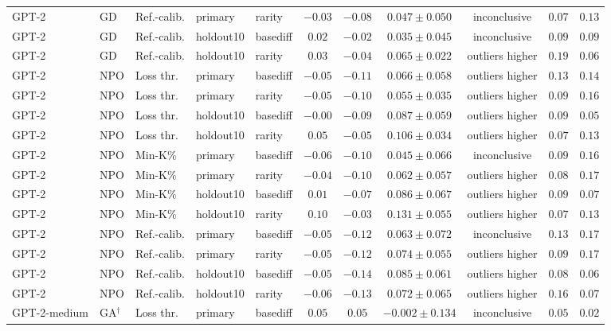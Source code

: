 {\begin{longtable}{@{\extracolsep{\fill}}lllllcccccc@{}}
GPT-2 & GD & Ref.-calib. & primary & rarity & $-0.03$ & $-0.08$ & $0.047 \pm 0.050$ & inconclusive & $0.07$ & $0.13$ \\
GPT-2 & GD & Ref.-calib. & holdout10 & basediff & $0.02$ & $-0.02$ & $0.035 \pm 0.045$ & inconclusive & $0.09$ & $0.09$ \\
GPT-2 & GD & Ref.-calib. & holdout10 & rarity & $0.03$ & $-0.04$ & $0.065 \pm 0.022$ & outliers higher & $0.19$ & $0.06$ \\
GPT-2 & NPO & Loss thr. & primary & basediff & $-0.05$ & $-0.11$ & $0.066 \pm 0.058$ & outliers higher & $0.13$ & $0.14$ \\
GPT-2 & NPO & Loss thr. & primary & rarity & $-0.05$ & $-0.10$ & $0.055 \pm 0.035$ & outliers higher & $0.09$ & $0.16$ \\
GPT-2 & NPO & Loss thr. & holdout10 & basediff & $-0.00$ & $-0.09$ & $0.087 \pm 0.059$ & outliers higher & $0.09$ & $0.05$ \\
GPT-2 & NPO & Loss thr. & holdout10 & rarity & $0.05$ & $-0.05$ & $0.106 \pm 0.034$ & outliers higher & $0.07$ & $0.13$ \\
GPT-2 & NPO & Min-K\% & primary & basediff & $-0.06$ & $-0.10$ & $0.045 \pm 0.066$ & inconclusive & $0.09$ & $0.16$ \\
GPT-2 & NPO & Min-K\% & primary & rarity & $-0.04$ & $-0.10$ & $0.062 \pm 0.057$ & outliers higher & $0.08$ & $0.17$ \\
GPT-2 & NPO & Min-K\% & holdout10 & basediff & $0.01$ & $-0.07$ & $0.086 \pm 0.067$ & outliers higher & $0.09$ & $0.07$ \\
GPT-2 & NPO & Min-K\% & holdout10 & rarity & $0.10$ & $-0.03$ & $0.131 \pm 0.055$ & outliers higher & $0.07$ & $0.13$ \\
GPT-2 & NPO & Ref.-calib. & primary & basediff & $-0.05$ & $-0.12$ & $0.063 \pm 0.072$ & inconclusive & $0.13$ & $0.17$ \\
GPT-2 & NPO & Ref.-calib. & primary & rarity & $-0.05$ & $-0.12$ & $0.074 \pm 0.055$ & outliers higher & $0.09$ & $0.17$ \\
GPT-2 & NPO & Ref.-calib. & holdout10 & basediff & $-0.05$ & $-0.14$ & $0.085 \pm 0.061$ & outliers higher & $0.08$ & $0.06$ \\
GPT-2 & NPO & Ref.-calib. & holdout10 & rarity & $-0.06$ & $-0.13$ & $0.072 \pm 0.065$ & outliers higher & $0.16$ & $0.07$ \\
GPT-2-medium & GA$^{\dagger}$ & Loss thr. & primary & basediff & $0.05$ & $0.05$ & $-0.002 \pm 0.134$ & inconclusive & $0.05$ & $0.02$ \\

\end{longtable}}
